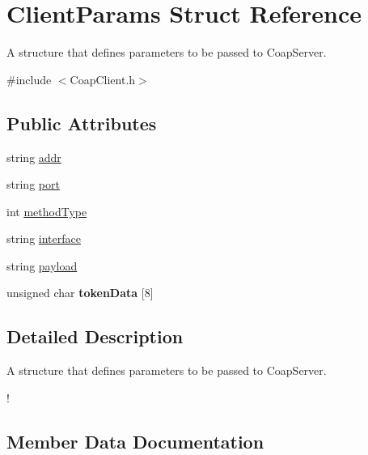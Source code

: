 \hypertarget{structClientParams}{}\section{Client\+Params Struct Reference}
\label{structClientParams}


A structure that defines parameters to be passed to Coap\+Server.  




{\ttfamily \#include $<$Coap\+Client.\+h$>$}

\subsection*{Public Attributes}
\begin{DoxyCompactItemize}
\item 
string \hyperlink{structClientParams_a3277dd9bc0fa8283a7d3b82d53f3c16a}{addr}
\item 
string \hyperlink{structClientParams_ade2b9a6084d6b1989c3440fe2cd60fdb}{port}
\item 
int \hyperlink{structClientParams_aa40f37f1eeb3ed6cff8a76e92a7e9bd1}{method\+Type}
\item 
string \hyperlink{structClientParams_a6af6f3817ebf9ed3f7d9378e6a23a59e}{interface}
\item 
string \hyperlink{structClientParams_aa16d76f3cbdfa5bfd4e54bcdb9a25737}{payload}
\item 
\mbox{\label{structClientParams_a2580869a746c7c8515c2b098ab97e9c7}} 
unsigned char {\bfseries token\+Data} \mbox{[}8\mbox{]}
\end{DoxyCompactItemize}


\subsection{Detailed Description}
A structure that defines parameters to be passed to Coap\+Server. 

! 

\subsection{Member Data Documentation}
\mbox{\label{structClientParams_a3277dd9bc0fa8283a7d3b82d53f3c16a}} 
